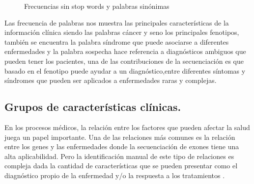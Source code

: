 \begin{figure}[]
	\centering
	\caption{Frecuencias sin stop words y palabras sinónimas} \label{fig:sin}
\end{figure} 

Las frecuencia de palabras nos muestra las principales características de la información clínica siendo las palabras cáncer y seno los principales fenotipos, también se encuentra la palabra síndrome que puede asociarse a diferentes  enfermedades y la palabra sospecha hace referencia a diagnósticos ambiguos que pueden tener los pacientes, una de las contribuciones de la secuenciación es que basado en el fenotipo puede ayudar a un diagnóstico,entre diferentes síntomas y síndromes que pueden ser aplicados a enfermedades raras y complejas\cite{Tetreault2015a}.

\subsection{Grupos de características clínicas.}

En los procesos médicos, la relación entre los factores que pueden afectar la salud juega un papel importante. Una de las relaciones más comunes es la relación entre los genes y las enfermedades donde la secuenciación de exones tiene una alta aplicabilidad. Pero la identificación manual de este tipo de relaciones es compleja dada la cantidad de características que se pueden presentar como el diagnóstico propio de la enfermedad y/o la respuesta a los tratamientos \cite{Kawashima2017}.

